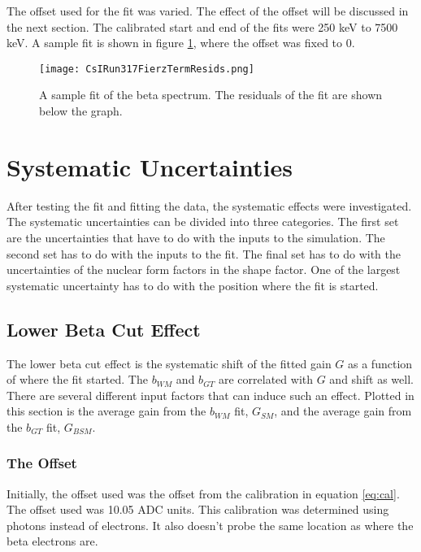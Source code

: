 \documentclass[../MaxHughesThesis.tex]{subfiles}
\begin{document}
The offset used for the fit was varied.
The effect of the offset will be discussed in the next section. 
The calibrated start and end of the fits were 250 keV to 7500 keV. 
A sample fit is shown in figure \ref{fig:samplefit}, where the offset was fixed to 0.

\begin{figure}[!htb]
	\centerline{\texttt{[image: CsIRun317FierzTermResids.png]}}
	\caption{A sample fit of the beta spectrum. 
		 The residuals of the fit are shown below the graph.}
	\label{fig:samplefit}
\end{figure}

\section{Systematic Uncertainties}

After testing the fit and fitting the data, the systematic effects were investigated.
The systematic uncertainties can be divided into three categories.
The first set are the uncertainties that have to do with the inputs to the simulation.
The second set has to do with the inputs to the fit.
The final set has to do with the uncertainties of the nuclear form factors in the shape factor. 
One of the largest systematic uncertainty has to do with the position where the fit is started. 

\subsection{Lower Beta Cut Effect}

The lower beta cut effect is the systematic shift of the fitted gain $G$ as a function of where the fit started.
The $b_{WM}$ and $b_{GT}$ are correlated with $G$ and shift as well.
There are several different input factors that can induce such an effect.
Plotted in this section is the average gain from the $b_{WM}$ fit, $G_{SM}$, and the average gain from the $b_{GT}$ fit, $G_{BSM}$.

\subsubsection{The Offset}
Initially, the offset used was the offset from the calibration in equation \ref{eq:cal}.
The offset used was 10.05 ADC units.
This calibration was determined using photons instead of electrons.
It also doesn't probe the same location as where the beta electrons are.
\end{document}
